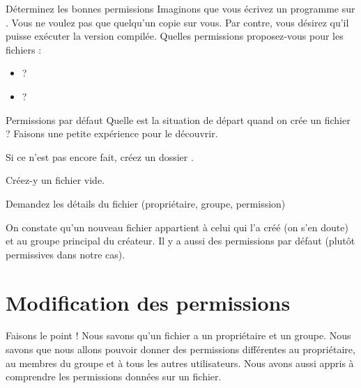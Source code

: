 \documentclass[a4paper,11pt]{style-esi/td}
\begin{document}
		\medskip
		\begin{Exercice}{Déterminez les bonnes permissions}\label{exo:permjava}
			Imaginons que vous écrivez un programme  sur .
			Vous ne voulez pas que quelqu'un copie sur vous.
			Par contre, vous désirez qu'il puisse exécuter la version 
			com\-pi\-lée.
			Quelles permissions proposez-vous pour les fichiers :
			\begin{itemize}
			\item {} ? 
				{\tiny
					\textfield{-}\quad
					\textfield{-}\textfield{-}\textfield{-}\quad
					\textfield{-}\textfield{-}\textfield{-}
				}
			\item \samp{.class} ? 
				{\tiny
					\textfield{-}\textfield{-}\quad
					\textfield{-}\textfield{-}\quad
					\textfield{-}\textfield{-}
				}
			\end{itemize}
		\end{Exercice}

		\begin{Experience}{Permissions par défaut}
			Quelle est la situation de départ quand on crée un fichier ?
			Faisons une petite expérience pour le découvrir.
			\begin{steps}
			\item Si ce n'est pas encore fait, créez un dossier .
			\item Créez-y un fichier vide.
			\item Demandez les détails du fichier (propriétaire, groupe, permission)
			\end{steps}
			On constate qu'un nouveau fichier appartient à celui qui l'a créé 
			(on s'en doute) et au groupe principal du créateur. 
			Il y a aussi des permissions par défaut (plutôt permissives dans notre cas).  
		\end{Experience}		
	
	\section{Modification des permissions}

		\begin{infotbox}{Faisons le point !}
			Nous savons qu'un fichier a un propriétaire et un groupe.
			Nous savons que nous allons pouvoir donner des permissions
			différentes au propriétaire, au membres du groupe 
			et à tous les autres utilisateurs.
			Nous avons aussi appris à comprendre les permissions données sur un fichier.
		\end{infotbox}
	
\end{document}
